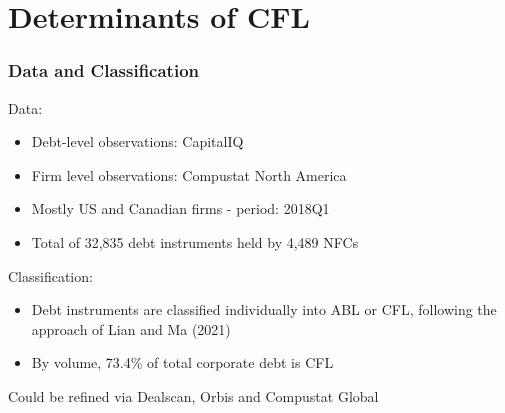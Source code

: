 \documentclass[notes]{beamer}
\begin{document}
\section{Determinants of CFL}

\begin{frame}[label=DandC]
\frametitle{Data and Classification}
Data: 
\begin{itemize}
\item Debt-level observations: CapitalIQ
\item Firm level observations: Compustat North America
\item Mostly US and Canadian firms - period: 2018Q1
\item Total of 32,835 debt instruments held by 4,489 NFCs
\end{itemize} \vspace{2mm}
Classification:
\begin{itemize}
\item Debt instruments are classified individually into ABL or CFL, following the approach of Lian and Ma (2021) 
\item By volume, 73.4\% of total corporate debt is CFL
\end{itemize}
Could be refined via Dealscan, Orbis and Compustat Global
\begin{center}
\hyperlink{Classification}{}
\end{center}
 
\end{frame}
\end{document}
